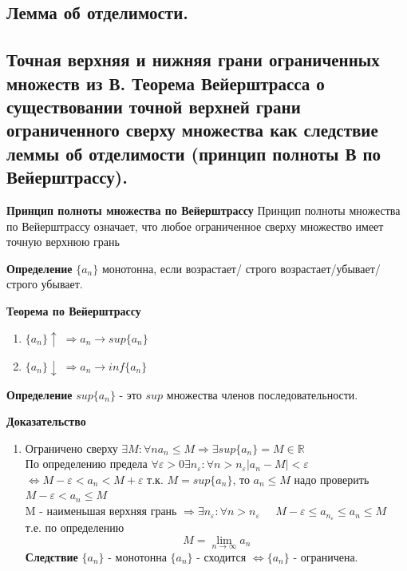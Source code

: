 \documentclass[12pt, a4paper]{article}
\newcommand{\R}{\mathbb{R}}
\begin{document}
\begin{centering}
\subsection{Лемма об отделимости.}

\subsection{Точная верхняя и нижняя грани ограниченных множеств из В. Теорема Вейерштрасса о существовании точной верхней грани ограниченного сверху множества как следствие леммы об отделимости (принцип полноты В по Вейерштрассу).}

\begin{tcolorbox}
    \textbf{Принцип полноты множества по Вейерштрассу}
    Принцип полноты множества по Вейерштрассу означает, что любое ограниченное сверху множество имеет точную верхнюю грань     
\end{tcolorbox}

\begin{tcolorbox}
    \textbf{Определение}
    $\{a_n\}$ монотонна, если возрастает/ строго возрастает/убывает/строго убывает.
\end{tcolorbox}

\begin{tcolorbox}
    \textbf{Теорема по Вейерштрассу}
    \begin{enumerate}
        \item $\{a_n\} \uparrow \; \Rightarrow a_n \to sup\{ a_n \}$
        \item $\{a_n\} \downarrow \; \Rightarrow a_n \to inf\{ a_n \}$
    \end{enumerate}
\end{tcolorbox}

\begin{tcolorbox}
    \textbf{Определение}
    $sup \{a_n\}$ - это $sup$ множества членов последовательности.
\end{tcolorbox}

\begin{tcolorbox}[title=Доказательство полноты $\R$ по Вейерштрассу]
    \textbf{Доказательство}
    \begin{enumerate}
        \item Ограничено сверху $\exists M: \forall n a_n \leq M \Rightarrow \exists sup\{a_n\} = M \in \R$\\
        По определению предела $\forall \varepsilon > 0 \exists n_\varepsilon: \forall n > n_\varepsilon |a_n - M| < \varepsilon $\\
        $\Leftrightarrow M-\varepsilon<a_n<M+\varepsilon$ т.к. $M=sup\{a_n\}$, то $a_n \leq M$ надо проверить $M-\varepsilon<a_n\leq M$\\
        M - наименьшая верхняя грань $\Rightarrow \exists n_\varepsilon: \forall n > n_\varepsilon \;\;\;\;\; M-\varepsilon \leq a_{n_\varepsilon} \leq a_n \leq M $\\
        т.е. по определению 
        \[M = \lim_{n\to\infty} a_n\]
        \textbf{Следствие} $\{a_n\}$ - монотонна $\{a_n\}$ - сходится $\Leftrightarrow \{a_n\}$ - ограничена.
    \end{enumerate}
\end{tcolorbox}


\end{centering}
\end{document}
